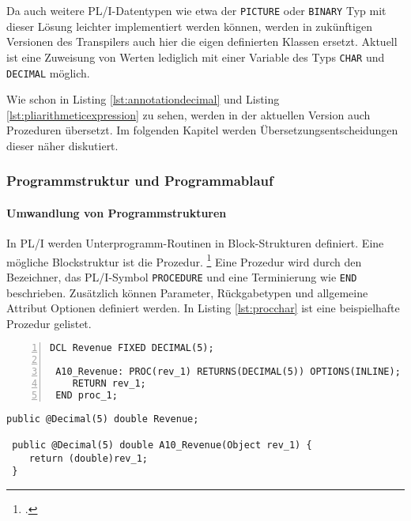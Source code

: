Da auch weitere PL/I-Datentypen wie etwa der \verb+PICTURE+ oder \verb+BINARY+ Typ mit dieser Lösung leichter implementiert werden können, werden in zukünftigen Versionen des Transpilers auch hier die eigen definierten Klassen ersetzt.
Aktuell ist eine Zuweisung von Werten lediglich mit einer Variable des Typs \verb+CHAR+ und \verb+DECIMAL+ möglich.

Wie schon in Listing \ref{lst:annotationdecimal} und Listing \ref{lst:pliarithmeticexpression} zu sehen, werden in der aktuellen Version auch Prozeduren übersetzt.
Im folgenden Kapitel werden Übersetzungsentscheidungen dieser näher diskutiert.


\subsubsection{Programmstruktur und Programmablauf}
\paragraph*{Umwandlung von Programmstrukturen }\label{programstruct}

In PL/I werden Unterprogramm-Routinen in Block-Strukturen definiert. Eine mögliche Blockstruktur ist die Prozedur. \footcite[Vgl. ][S. 97ff. ]{pliref}
Eine Prozedur wird durch den Bezeichner, das PL/I-Symbol \verb+PROCEDURE+ und eine Terminierung wie \verb+END+ beschrieben.
Zusätzlich können Parameter, Rückgabetypen und allgemeine Attribut Optionen definiert werden. In Listing \ref{lst:procchar} ist eine beispielhafte Prozedur gelistet.

\begin{minipage}[b]{0.48\linewidth}
	\centering
	\lstset{language=PL/I,label=SliceExaple}
	\begin{lstlisting}[frame=single, numbers=left, mathescape,%
		caption={Transformation einer Prozedur}, label={lst:procchar},
		basicstyle=\fontsize{9}{13}\selectfont\ttfamily]
 DCL Revenue FIXED DECIMAL(5);
		
 A10_Revenue: PROC(rev_1) RETURNS(DECIMAL(5)) OPTIONS(INLINE);
 	RETURN rev_1;
 END proc_1;
	\end{lstlisting}
\end{minipage}
\hspace{0.5cm}
\begin{minipage}[b]{0.48\linewidth}
	\centering
	\lstset{language=Java,label=SliceExaple}
	\begin{lstlisting}[frame=single, mathescape,%
		title={" "},
		basicstyle=\fontsize{9}{13}\selectfont\ttfamily]
 public @Decimal(5) double Revenue;		
		
 public @Decimal(5) double A10_Revenue(Object rev_1) { 
 	return (double)rev_1;
 }
	\end{lstlisting}
\end{minipage}

